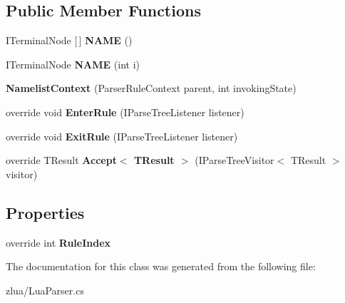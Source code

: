 \subsection*{Public Member Functions}
\begin{DoxyCompactItemize}
\item 
\mbox{\label{classzlua_1_1_lua_parser_1_1_namelist_context_a3ee746b5f8b64fdc071317931eddc1b9}} 
I\+Terminal\+Node \mbox{[}$\,$\mbox{]} {\bfseries N\+A\+ME} ()
\item 
\mbox{\label{classzlua_1_1_lua_parser_1_1_namelist_context_a1b2ad915a122d6bdc0412d5925dccff9}} 
I\+Terminal\+Node {\bfseries N\+A\+ME} (int i)
\item 
\mbox{\label{classzlua_1_1_lua_parser_1_1_namelist_context_a3d202c5091f2c7e22ffff5be67af0c91}} 
{\bfseries Namelist\+Context} (Parser\+Rule\+Context parent, int invoking\+State)
\item 
\mbox{\label{classzlua_1_1_lua_parser_1_1_namelist_context_a2d8425363e18f3e800bc4c8a2bc1f6be}} 
override void {\bfseries Enter\+Rule} (I\+Parse\+Tree\+Listener listener)
\item 
\mbox{\label{classzlua_1_1_lua_parser_1_1_namelist_context_a0b3f4544e90da0027150571a4e85cfb0}} 
override void {\bfseries Exit\+Rule} (I\+Parse\+Tree\+Listener listener)
\item 
\mbox{\label{classzlua_1_1_lua_parser_1_1_namelist_context_a49937ed7830ccf4aee56ecaf2d72af0c}} 
override T\+Result {\bfseries Accept$<$ T\+Result $>$} (I\+Parse\+Tree\+Visitor$<$ T\+Result $>$ visitor)
\end{DoxyCompactItemize}
\subsection*{Properties}
\begin{DoxyCompactItemize}
\item 
\mbox{\label{classzlua_1_1_lua_parser_1_1_namelist_context_a58145eb4b995fd421265c5eba7a9b3fe}} 
override int {\bfseries Rule\+Index}
\end{DoxyCompactItemize}


The documentation for this class was generated from the following file\+:\begin{DoxyCompactItemize}
\item 
zlua/Lua\+Parser.\+cs\end{DoxyCompactItemize}
